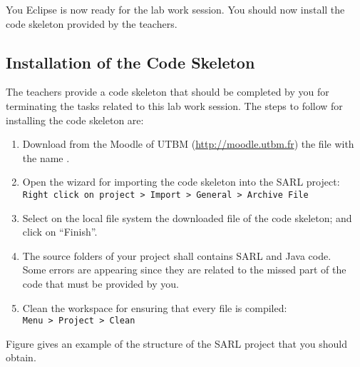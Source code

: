 You Eclipse is now ready for the lab work session. You should now install the code skeleton provided by the teachers.

\subsection{Installation of the Code Skeleton}

The teachers provide a code skeleton that should be completed by you for terminating the tasks related to this lab work session.
The steps to follow for installing the code skeleton are:
\begin{enumerate}
\item Download from the Moodle of UTBM (\url{http://moodle.utbm.fr}) the file with the name \skeletonName.
\item Open the wizard for importing the code skeleton into the SARL project: \\
	\texttt{Right click on project > Import > General > Archive File}
\item Select on the local file system the downloaded file of the code skeleton; and click on ``Finish''.
\item The source folders of your project shall contains SARL and Java code. \\
	Some errors are appearing since they are related to the missed part of the code that must be provided by you. 
\item Clean the workspace for ensuring that every file is compiled: \\
	\texttt{Menu > Project > Clean}
\end{enumerate}

Figure  gives an example of the structure of the SARL project that you should obtain.


